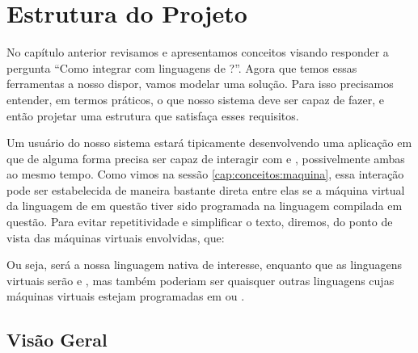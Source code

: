 \chapter{Estrutura do Projeto}
\label{sec:estrutura}

\setcounter{defcnt}{0}

  No capítulo anterior revisamos e apresentamos conceitos visando responder a
  pergunta ``Como integrar \CXX{} com linguagens de \script{}?''. Agora que
  temos essas ferramentas a nosso dispor, vamos modelar uma solução. Para isso
  precisamos entender, em termos práticos, o que nosso sistema deve ser capaz
  de fazer, e então projetar uma estrutura que satisfaça esses requisitos.
  
  Um usuário do nosso sistema estará tipicamente desenvolvendo uma aplicação
  em \CXX{} que de alguma forma precisa ser capaz de interagir com 
  e , possivelmente ambas ao mesmo tempo. Como vimos na sessão
  \ref{cap:conceitos:maquina}, essa interação pode ser estabelecida de maneira
  bastante direta entre elas se a máquina virtual da linguagem de \script{} em
  questão tiver sido programada na linguagem compilada em questão. Para evitar
  repetitividade e simplificar o texto, diremos, do ponto de vista das
  máquinas virtuais envolvidas, que:


  Ou seja, \CXX{} será a nossa linguagem nativa de interesse, enquanto que
  as linguagens virtuais serão  e , mas também poderiam
  ser quaisquer outras linguagens cujas máquinas virtuais estejam programadas em
  \C{} ou \CXX{}.

  \section{Visão Geral}
  \label{sec:estrutura:geral}

